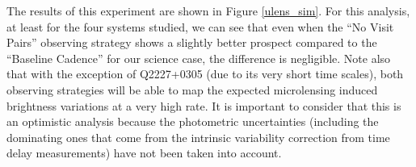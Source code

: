 The results of this experiment are shown in Figure \ref{ulens_sim}. For this analysis, at least for the four systems studied, we can see that even when the ``No Visit Pairs'' observing strategy shows a slightly better prospect compared to the ``Baseline Cadence'' for our science case, the difference is negligible. Note also that with the exception of Q2227+0305 (due to its very short time scales), both observing strategies will be able to map the expected microlensing induced brightness variations at a very high rate. It is important to consider that this is an optimistic analysis because the photometric uncertainties (including the dominating ones that come from the intrinsic variability correction from time delay measurements) have not been taken into account.



%
%
%
%

\navigationbar
